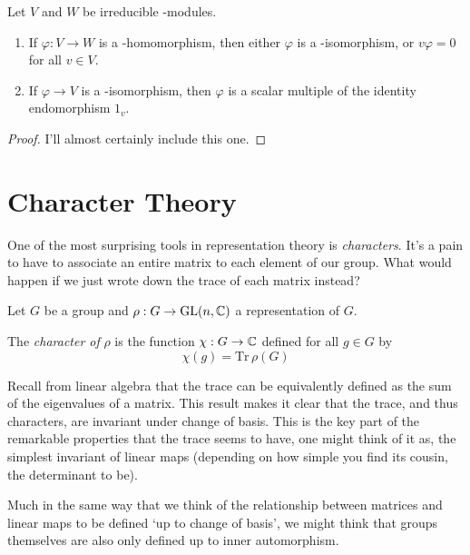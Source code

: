 \begin{theorem}
    Let $V$ and $W$ be irreducible \CG-modules.

    \begin{enumerate}
        \item If $\varphi : V \rightarrow W$ is a \CG-homomorphism, then either $\varphi$ is a \CG-isomorphism, or 
            $v\varphi = 0$ for all $v \in V$. 
            
        \item If $\varphi \rightarrow V$ is a \CG-isomorphism, then $\varphi$ is a scalar multiple of the identity 
            endomorphism $1_v$.
    \end{enumerate}
\end{theorem}

\begin{proof}
    I'll almost certainly include this one.
\end{proof}


\section{Character Theory}

One of the most surprising tools in representation theory is \emph{characters}. It's a pain to have to associate an 
entire matrix to each element of our group. What would happen if we just wrote down the trace of each matrix 
instead?




\begin{definition}
    Let $G$ be a group and $\rho : G \rightarrow \operatorname{GL}(n, \mathbb{C})$ a representation of $G$. 

    The \emph{character of }$\rho$ is the function $\chi : G \rightarrow \mathbb{C}$ defined for all $g \in G$ by
    \[
        \chi(g) = \text{Tr}\,\rho(G)
  \]
\end{definition}

Recall from linear algebra that the trace can be equivalently defined as the sum of the eigenvalues of a matrix. 
This result makes it clear that the trace, and thus characters, are invariant under change of basis. This is the 
key part of the remarkable properties that the trace seems to have, one might think of it as, the simplest 
invariant of linear maps (depending on how simple you find its cousin, the determinant to be).


Much in the same way that we think of the relationship between matrices and linear maps to be defined `up to change 
of basis', we might think that groups themselves are also only defined up to inner automorphism.

